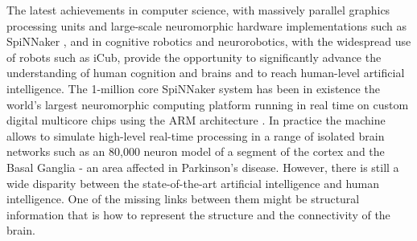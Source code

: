 \documentclass[preprint,12pt]{elsarticle}
\begin{document}
The latest achievements in computer science, with massively parallel graphics processing units and large-scale neuromorphic hardware implementations such as SpiNNaker \cite{Furber2013}, and in cognitive robotics and neurorobotics, with the widespread use of robots such as iCub, provide the opportunity to significantly advance the understanding of human cognition and brains and to reach human-level artificial intelligence. 
The 1-million core SpiNNaker system has been in existence the world’s largest neuromorphic computing platform running in real time on custom digital multicore chips using the ARM architecture \cite{Furber2020}.
In practice the machine allows to simulate high-level real-time processing in a range of isolated brain networks such as 
an 80,000 neuron model of a segment of the cortex and the Basal Ganglia - an area affected in Parkinson’s disease.
However, there is still a wide disparity between the state-of-the-art artificial intelligence and human intelligence.
One of the missing links between them might be structural information that is how to represent the structure and the connectivity of the brain.
\end{document}
